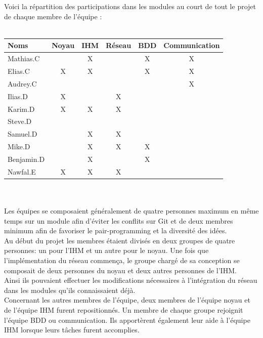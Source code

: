 \documentclass[a4paper,11pt]{article}
\begin{document}
\newpage

Voici la répartition des participations dans les modules au court de tout le projet de chaque membre de l’équipe : \\\\



\begin{tabular}{|l|c|c|c|c|c|}
  \hline
  Noms & Noyau & IHM & Réseau & BDD & Communication \\
  \hline
  Mathias.C &  & X &  & X & X \\
  \hline
  Elias.C & X & X &  & X & X \\
  \hline
  Audrey.C &  &  &  &  & X \\
  \hline
  Ilias.D & X &  & X &  &  \\
  \hline
  Karim.D & X & X & X &  &  \\
  \hline
  Steve.D &  &  &  &  &  \\
  \hline
  Samuel.D &  & X & X &  &  \\
  \hline
  Mike.D &  & X & X & X &  \\
  \hline
  Benjamin.D &  & X &  & X &  \\
  \hline
  Nawfal.E & X & X & X &  &  \\
  \hline
\end{tabular} \\\\


    Les équipes se composaient généralement de quatre personnes maximum en même temps sur un module afin d’éviter les conflits sur Git et de deux membres minimum afin de favoriser le pair-programming et la diversité des idées.\\

    Au début du projet les membres étaient divisés en deux groupes de quatre personnes: un pour l’IHM et un autre pour le noyau. Une fois que l’implémentation du réseau commença, le groupe chargé de sa conception se composait de deux personnes du noyau et deux autres personnes de l’IHM.\\

    Ainsi ils pouvaient effectuer les modifications nécessaires à l’intégration du réseau dans les modules qu’ils connaissaient déjà. \\

    Concernant les autres membres de l’équipe, deux membres de l’équipe noyau et de l’équipe IHM furent repositionnés. Un membre de chaque groupe rejoignit l’équipe BDD ou communication. Ils apportèrent également leur aide à l’équipe IHM lorsque leurs tâches furent accomplies. \\
\end{document}
